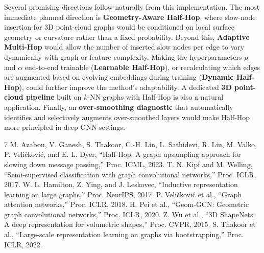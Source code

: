 \documentclass[conference]{IEEEtran}
\begin{document}
Several promising directions follow naturally from this implementation. The most immediate planned direction is \textbf{Geometry-Aware Half-Hop}, where slow-node insertion for 3D point-cloud graphs would be conditioned on local surface geometry or curvature rather than a fixed probability. Beyond this, \textbf{Adaptive Multi-Hop} would allow the number of inserted slow nodes per edge to vary dynamically with graph or feature complexity. Making the hyperparameters $p$ and $\alpha$ end-to-end trainable (\textbf{Learnable Half-Hop}), or recalculating which edges are augmented based on evolving embeddings during training (\textbf{Dynamic Half-Hop}), could further improve the method's adaptability. A dedicated \textbf{3D point-cloud pipeline} built on $k$-NN graphs with Half-Hop is also a natural application. Finally, an \textbf{over-smoothing diagnostic} that automatically identifies and selectively augments over-smoothed layers would make Half-Hop more principled in deep GNN settings.

\begin{thebibliography}{7}
 M. Azabou, V. Ganesh, S. Thakoor, C.-H. Lin, L. Sathidevi, R. Liu, M. Valko, P. Veli\v{c}kovi\'c, and E. L. Dyer, ``Half-Hop: A graph upsampling approach for slowing down message passing,'' Proc. ICML, 2023.
 T. N. Kipf and M. Welling, ``Semi-supervised classification with graph convolutional networks,'' Proc. ICLR, 2017.
 W. L. Hamilton, Z. Ying, and J. Leskovec, ``Inductive representation learning on large graphs,'' Proc. NeurIPS, 2017.
 P. Veli\v{c}kovi\'c et al., ``Graph attention networks,'' Proc. ICLR, 2018.
 H. Pei et al., ``Geom-GCN: Geometric graph convolutional networks,'' Proc. ICLR, 2020.
 Z. Wu et al., ``3D ShapeNets: A deep representation for volumetric shapes,'' Proc. CVPR, 2015.
 S. Thakoor et al., ``Large-scale representation learning on graphs via bootstrapping,'' Proc. ICLR, 2022.
\end{thebibliography}
\end{document}
